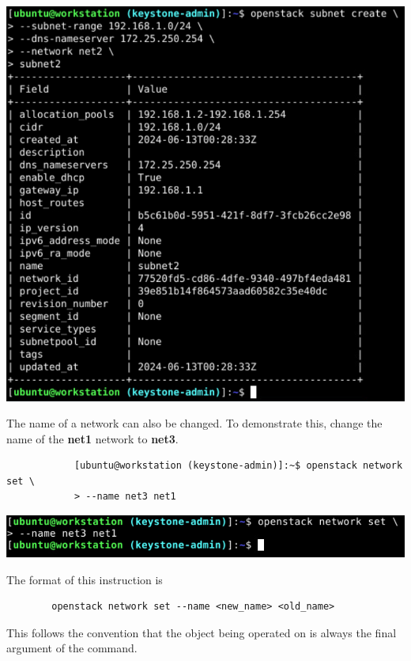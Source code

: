 \documentclass[letterpaper, 12pt]{article}
\begin{document}
\begin{enumerate}
\begin{labstep}
        \begin{center}
            \includegraphics[scale=0.65]{images/part3/step13.png}
        \end{center}
    \end{labstep}

    \begin{labstep}
        The name of a network can also be changed.
        To demonstrate this, change the name of the \textbf{net1} network to \textbf{net3}.
        \begin{lstlisting}
            [ubuntu@workstation (keystone-admin)]:~$ openstack network set \
            > --name net3 net1
        \end{lstlisting}

        \begin{center}
            \includegraphics[width=\linewidth]{images/part3/step14.png}
        \end{center}
    \end{labstep}

    \begin{notebox}
        The format of this instruction is
        \begin{lstlisting}
        openstack network set --name <new_name> <old_name>
        \end{lstlisting}
        This follows the convention that the object being operated on is always the final argument of the command.
    \end{notebox}


\end{enumerate}
\end{document}
